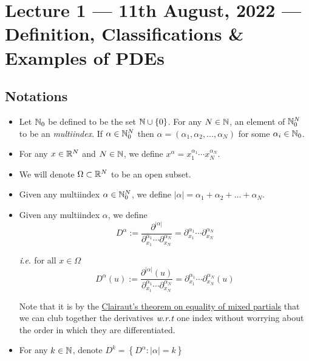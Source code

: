 \section{Lecture 1 --- 11th August, 2022 --- Definition, Classifications \& Examples of PDEs}



\subsection{Notations}
\begin{itemize}[label=--]
    \item Let $\mathbb N _0$ be defined to be the set $\mathbb N \cup \left\{ 0 \right\}$. For any $N\in \mathbb N$, an element of $\mathbb N _ 0 ^N$ to be an \textit{multiindex}. If $\alpha \in \mathbb N _0 ^N$ then $\alpha = \left( \alpha _1 ,\alpha_2,\ldots, \alpha_N \right)$ for some $\alpha_i \in \mathbb N _0$.

    \item For any $x\in \mathbb R ^N$ and $N\in \mathbb N$, we define $x^\alpha = x_1 ^{\alpha_1}\cdots x_N ^{\alpha _N}$.

    \item We will denote $\Omega \subset \mathbb R ^N$ to be an open subset.

    \item Given any multiindex $\alpha \in \mathbb N _0 ^N$, we define $|\alpha | =\alpha_1 + \alpha _2 + \ldots + \alpha _N$.

    \item Given any multiindex $\alpha$, we define
    \begin{equation*}
        D^{\alpha} := \frac{\partial ^{|\alpha|}}{\partial_{x_{1}} ^{\alpha_1} \cdots \partial_{x_{N}} ^{\alpha_N}} = \partial_{ x_1 }^{\alpha _1}\cdots \partial_{ x_N }^{\alpha_N}
    \end{equation*}

    $\textit{i}.\textit{e}.$ for all $x\in \Omega$
    \begin{equation*}
        D^{\alpha}(u) := \frac{\partial ^{|\alpha|}(u)}{\partial_{x_{1}} ^{\alpha_1} \cdots \partial_{x_{N}} ^{\alpha_N}} = \partial_{ x_1 }^{\alpha _1}\cdots \partial_{ x_N }^{\alpha_N}(u)
    \end{equation*}

    \begin{remark}
    Note that it is by the \href{'https://calculus.subwiki.org/wiki/Clairaut's_theorem_on_equality_of_mixed_partials'}{Clairaut's theorem on equality of mixed partials} that we can club together the derivatives $\textit{w}.\textit{r}.\textit{t}$ one index without worrying about the order in which they are differentiated.
    \end{remark}
    \item For any $k\in \mathbb N$, denote $D^k =\left\{ D^{\alpha} : |\alpha| =k \right\}$
\end{itemize}



